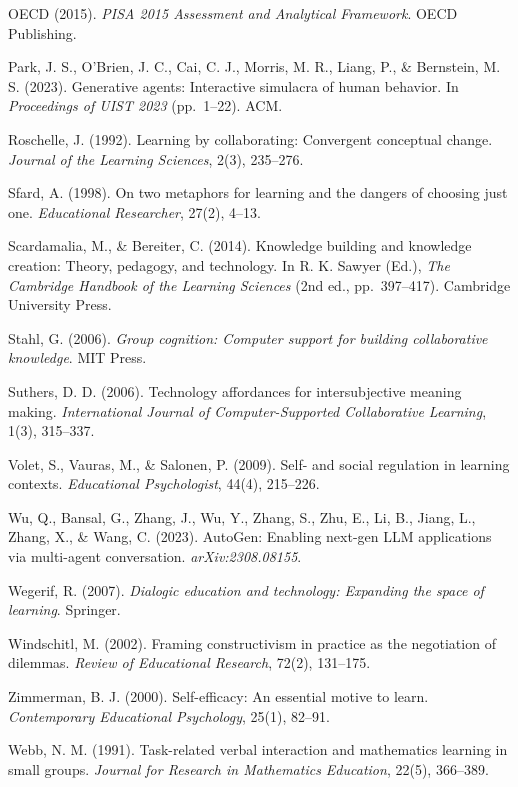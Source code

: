 \documentclass[
  11pt,
]{article}
\begin{document}
OECD (2015). \emph{PISA 2015 Assessment and Analytical Framework}. OECD Publishing.

Park, J. S., O'Brien, J. C., Cai, C. J., Morris, M. R., Liang, P., \& Bernstein, M. S. (2023). Generative agents: Interactive simulacra of human behavior. In \emph{Proceedings of UIST 2023} (pp.\ 1--22). ACM.

Roschelle, J. (1992). Learning by collaborating: Convergent conceptual change. \emph{Journal of the Learning Sciences}, 2(3), 235--276.

Sfard, A. (1998). On two metaphors for learning and the dangers of choosing just one. \emph{Educational Researcher}, 27(2), 4--13.

Scardamalia, M., \& Bereiter, C. (2014). Knowledge building and knowledge creation: Theory, pedagogy, and technology. In R. K. Sawyer (Ed.), \emph{The Cambridge Handbook of the Learning Sciences} (2nd ed., pp.\ 397--417). Cambridge University Press.

Stahl, G. (2006). \emph{Group cognition: Computer support for building collaborative knowledge}. MIT Press.

Suthers, D. D. (2006). Technology affordances for intersubjective meaning making. \emph{International Journal of Computer-Supported Collaborative Learning}, 1(3), 315--337.

Volet, S., Vauras, M., \& Salonen, P. (2009). Self- and social regulation in learning contexts. \emph{Educational Psychologist}, 44(4), 215--226.

Wu, Q., Bansal, G., Zhang, J., Wu, Y., Zhang, S., Zhu, E., Li, B., Jiang, L., Zhang, X., \& Wang, C. (2023). AutoGen: Enabling next-gen LLM applications via multi-agent conversation. \emph{arXiv:2308.08155}.

Wegerif, R. (2007). \emph{Dialogic education and technology: Expanding the space of learning}. Springer.

Windschitl, M. (2002). Framing constructivism in practice as the negotiation of dilemmas. \emph{Review of Educational Research}, 72(2), 131--175.

Zimmerman, B. J. (2000). Self-efficacy: An essential motive to learn. \emph{Contemporary Educational Psychology}, 25(1), 82--91.

Webb, N. M. (1991). Task-related verbal interaction and mathematics learning in small groups. \emph{Journal for Research in Mathematics Education}, 22(5), 366--389.
\end{document}
